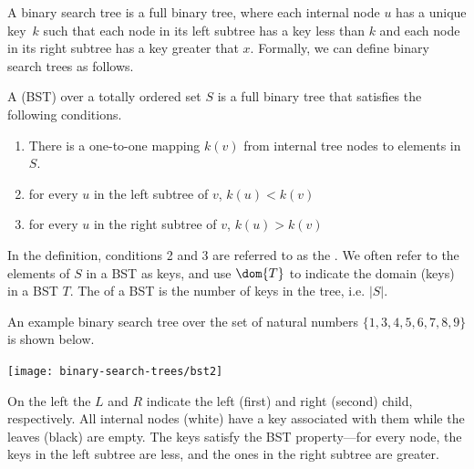 \begin{chapter}
A binary search tree is a full binary tree, where each internal node
$u$ has a unique key~$k$ such that each node in its left subtree has a
key less than $k$ and each node in its right subtree has a key greater
that $x$.  
%
Formally, we can define binary search trees as follows.
%
\begin{definition}
\label{def:bst::bst}
A  (BST) over a totally ordered set $S$ is a
full binary tree that satisfies the following conditions.
\begin{enumerate}
 \item There is a one-to-one mapping $k(v)$ from internal tree nodes to elements in $S$.
 \item for every $u$ in the left subtree of $v$, $k(u) < k(v)$
 \item for every $u$ in the right subtree of $v$, $k(u) > k(v)$
\end{enumerate}
%
In the definition, conditions 2 and 3 are referred to as the .  We often refer to the elements of $S$ in a BST as keys,
and use $\dom{T}$ to indicate the domain (keys) in a BST $T$.  The
 of a BST is the number of keys in the tree, i.e. $|S|$.



\end{definition}

\begin{example}
\label{ex:bst}
An example binary search tree over the set of natural numbers
$\{1,3,4,5,6,7,8,9\}$ is shown below.
\begin{center}
  \texttt{[image: binary-search-trees/bst2]}~~~~~~~
\end{center}
On the left the $L$ and $R$ indicate the left (first) and right
(second) child, respectively.  All internal nodes (white) have a key
associated with them while the leaves (black) are empty.  The keys
satisfy the BST property---for every node, the keys in the left
subtree are less, and the ones in the right subtree are greater. 



\end{example}
\end{chapter}
